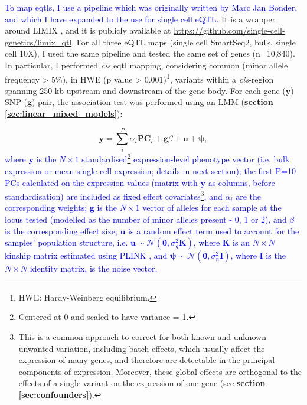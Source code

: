 \textcolor{blue}{To map \glspl{eqtl}, I use a pipeline which was originally written by Marc Jan Bonder, and which I have expanded to the use for single cell eQTL. }
It is a wrapper around LIMIX \cite{lippert2014limix, casale2015efficient}, and it is publicly available at \url{https://github.com/single-cell-genetics/limix_qtl}. 
For all three eQTL maps (single cell SmartSeq2, bulk, single cell 10X), I used the same pipeline and tested the same set of genes (n=10,840). 
In particular, I performed \textit{cis} \gls{eqtl} mapping, considering common (minor allele frequency > 5\%), in HWE (p value > 0.001)\footnote{HWE: Hardy-Weinberg equilibrium.}, variants within a \textit{cis}-region spanning 250 kb upstream and downstream of the gene body.
For each gene ($\mathbf{y}$) SNP ($\mathbf{g}$) pair, the association test was performed using an LMM (\textbf{section
\ref{sec:linear_mixed_models}}):

\begin{equation}\label{eq:LMM_ipsc_eqtl}
    \mathbf{y} = \sum_i^{P}\alpha_i \mathbf{PC}_i + \mathbf{g}\beta + \mathbf{u} + \boldsymbol{\psi},  
\end{equation}
\textcolor{blue}{where $\mathbf{y}$ is the $N \times 1$ standardised\footnote{Centered at 0 and scaled to have variance = 1.} expression-level phenotype vector (i.e. bulk expression or mean single cell expression; details in next section); the first P=10 PCs calculated on the expression values (matrix with $\mathbf{y}$ as columns, before standardisation) are included as fixed effect covariates\footnote{This is a common approach to correct for both known and unknown unwanted variation, including batch effects, which usually affect the expression of many genes, and therefore are detectable in the principal components of expression. 
Moreover, these global effects are orthogonal to the effects of a single variant on the expression of one gene (see \textbf{section \ref{sec:confounders}}).}, and $\alpha_i$ are the corresponding weights; $\mathbf{g}$ is the $N \times 1$ vector of alleles for each sample at the locus tested (modelled as the number of minor alleles present - 0, 1 or 2), and $\beta$ is the corresponding effect size; $\mathbf{u}$ is a random effect term used to account for the samples' population structure, i.e. $\mathbf{u} \sim \mathcal{N}(\mathbf{0}, \sigma_g^2\mathbf{K})$, where $\mathbf{K}$ is an $N \times N$ kinship matrix estimated using PLINK \cite{purcell2007plink}, and $\boldsymbol{\psi} \sim \mathcal{N}(\mathbf{0}, \sigma_n^2\mathbf{I})$, where $\mathbf{I}$ is the $N \times N$ identity matrix, is the noise vector. }
\\

